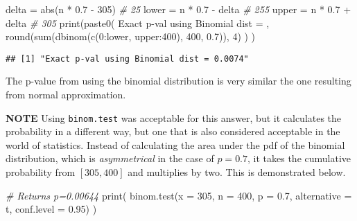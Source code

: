 \documentclass[
]{article}
\newenvironment{Shaded}{\begin{snugshade}}{\end{snugshade}}
\newcommand{\AttributeTok}[1]{\textcolor[rgb]{0.77,0.63,0.00}{#1}}
\newcommand{\CommentTok}[1]{\textcolor[rgb]{0.56,0.35,0.01}{\textit{#1}}}
\newcommand{\DecValTok}[1]{\textcolor[rgb]{0.00,0.00,0.81}{#1}}
\newcommand{\FloatTok}[1]{\textcolor[rgb]{0.00,0.00,0.81}{#1}}
\newcommand{\FunctionTok}[1]{\textcolor[rgb]{0.00,0.00,0.00}{#1}}
\newcommand{\NormalTok}[1]{#1}
\newcommand{\OtherTok}[1]{\textcolor[rgb]{0.56,0.35,0.01}{#1}}
\newcommand{\SpecialCharTok}[1]{\textcolor[rgb]{0.00,0.00,0.00}{#1}}
\newcommand{\StringTok}[1]{\textcolor[rgb]{0.31,0.60,0.02}{#1}}
\begin{document}
\begin{Shaded}
\begin{Highlighting}[]
\NormalTok{delta }\OtherTok{=} \FunctionTok{abs}\NormalTok{(n }\SpecialCharTok{*} \FloatTok{0.7} \SpecialCharTok{{-}} \DecValTok{305}\NormalTok{) }\CommentTok{\# 25}
\NormalTok{lower }\OtherTok{=}\NormalTok{ n }\SpecialCharTok{*} \FloatTok{0.7} \SpecialCharTok{{-}}\NormalTok{ delta }\CommentTok{\# 255}
\NormalTok{upper }\OtherTok{=}\NormalTok{ n }\SpecialCharTok{*} \FloatTok{0.7} \SpecialCharTok{+}\NormalTok{ delta }\CommentTok{\# 305}
\FunctionTok{print}\NormalTok{(}\FunctionTok{paste0}\NormalTok{(}
  \StringTok{\textquotesingle{}Exact p{-}val using Binomial dist = \textquotesingle{}}\NormalTok{,}
  \FunctionTok{round}\NormalTok{(}\FunctionTok{sum}\NormalTok{(}\FunctionTok{dbinom}\NormalTok{(}\FunctionTok{c}\NormalTok{(}\DecValTok{0}\SpecialCharTok{:}\NormalTok{lower, upper}\SpecialCharTok{:}\DecValTok{400}\NormalTok{), }\DecValTok{400}\NormalTok{, }\FloatTok{0.7}\NormalTok{)), }\DecValTok{4}\NormalTok{)}
\NormalTok{  )}
\NormalTok{)}
\end{Highlighting}
\end{Shaded}

\begin{verbatim}
## [1] "Exact p-val using Binomial dist = 0.0074"
\end{verbatim}

The p-value from using the binomial distribution is very similar the one
resulting from normal approximation.

\textbf{NOTE} Using \texttt{binom.test} was acceptable for this answer,
but it calculates the probability in a different way, but one that is
also considered acceptable in the world of statistics. Instead of
calculating the area under the pdf of the binomial distribution, which
is \emph{asymmetrical} in the case of \(p=0.7\), it takes the cumulative
probability from \([305, 400]\) and multiplies by two. This is
demonstrated below.

\begin{Shaded}
\begin{Highlighting}[]
\CommentTok{\# Returns p=0.00644}
\FunctionTok{print}\NormalTok{(}
  \FunctionTok{binom.test}\NormalTok{(}\AttributeTok{x =} \DecValTok{305}\NormalTok{, }\AttributeTok{n =} \DecValTok{400}\NormalTok{, }\AttributeTok{p =} \FloatTok{0.7}\NormalTok{, }\AttributeTok{alternative =} \StringTok{\textquotesingle{}t\textquotesingle{}}\NormalTok{, }\AttributeTok{conf.level =} \FloatTok{0.95}\NormalTok{)}
\NormalTok{)}
\end{Highlighting}
\end{Shaded}
\end{document}
